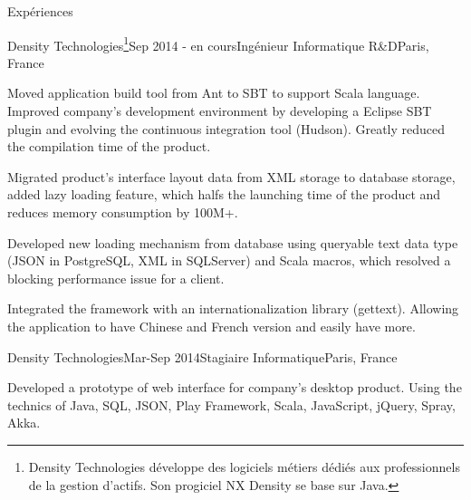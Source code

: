 \documentclass{resume} %
\begin{document}

\begin{rSection}{Expériences}

\begin{rSubsection}{Density Technologies\footnote{Density Technologies développe des logiciels métiers dédiés aux professionnels de la gestion d’actifs. Son progiciel NX Density se base sur Java.}}{Sep 2014 - en cours}{Ingénieur Informatique R\&D}{Paris, France}
\item Moved application build tool from Ant to SBT to support Scala language. Improved company's development environment by developing a Eclipse SBT plugin and evolving the continuous integration tool (Hudson). Greatly reduced the compilation time of the product.
\item Migrated product's interface layout data from XML storage to database storage, added lazy loading feature, which halfs the launching time of the product and reduces memory consumption by 100M+.
\item Developed new loading mechanism from database using queryable text data type (JSON in PostgreSQL, XML in SQLServer) and Scala macros, which resolved a blocking performance issue for a client.
\item Integrated the framework with an internationalization library (gettext). Allowing the application to have Chinese and French version and easily have more.
\end{rSubsection}

\begin{rSubsection}{Density Technologies}{Mar-Sep 2014}{Stagiaire Informatique}{Paris, France}
\item Developed a prototype of web interface for company's desktop product. Using the technics of Java, SQL, JSON, Play Framework, Scala, JavaScript, jQuery, Spray, Akka.
\end{rSubsection}

\end{rSection}


 
\end{document}

